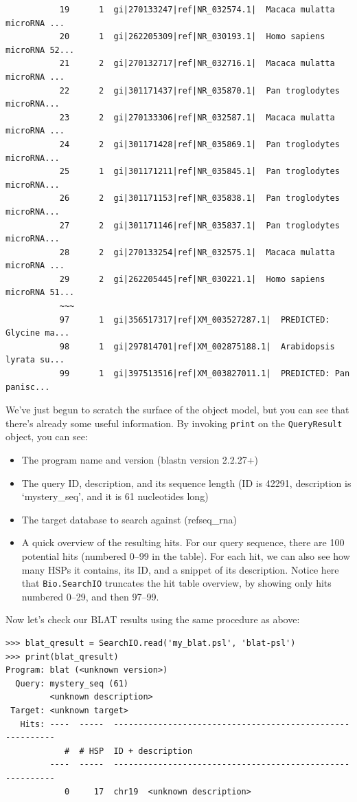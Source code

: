 \documentclass{report}
\begin{document}
\begin{verbatim}
           19      1  gi|270133247|ref|NR_032574.1|  Macaca mulatta microRNA ...
           20      1  gi|262205309|ref|NR_030193.1|  Homo sapiens microRNA 52...
           21      2  gi|270132717|ref|NR_032716.1|  Macaca mulatta microRNA ...
           22      2  gi|301171437|ref|NR_035870.1|  Pan troglodytes microRNA...
           23      2  gi|270133306|ref|NR_032587.1|  Macaca mulatta microRNA ...
           24      2  gi|301171428|ref|NR_035869.1|  Pan troglodytes microRNA...
           25      1  gi|301171211|ref|NR_035845.1|  Pan troglodytes microRNA...
           26      2  gi|301171153|ref|NR_035838.1|  Pan troglodytes microRNA...
           27      2  gi|301171146|ref|NR_035837.1|  Pan troglodytes microRNA...
           28      2  gi|270133254|ref|NR_032575.1|  Macaca mulatta microRNA ...
           29      2  gi|262205445|ref|NR_030221.1|  Homo sapiens microRNA 51...
           ~~~
           97      1  gi|356517317|ref|XM_003527287.1|  PREDICTED: Glycine ma...
           98      1  gi|297814701|ref|XM_002875188.1|  Arabidopsis lyrata su...
           99      1  gi|397513516|ref|XM_003827011.1|  PREDICTED: Pan panisc...
\end{verbatim}

We've just begun to scratch the surface of the object model, but you can see that
there's already some useful information. By invoking \verb|print| on the
\verb|QueryResult| object, you can see:

\begin{itemize}
\item The program name and version (blastn version 2.2.27+)
\item The query ID, description, and its sequence length (ID is 42291,
    description is `mystery\_seq', and it is 61 nucleotides long)
\item The target database to search against (refseq\_rna)
\item A quick overview of the resulting hits. For our query sequence, there are
    100 potential hits (numbered 0--99 in the table). For each hit, we can also see
    how many HSPs it contains, its ID, and a snippet of its description. Notice
    here that \verb|Bio.SearchIO| truncates the hit table overview, by showing
    only hits numbered 0--29, and then 97--99.
\end{itemize}

Now let's check our BLAT results using the same procedure as above:

\begin{verbatim}
>>> blat_qresult = SearchIO.read('my_blat.psl', 'blat-psl')
>>> print(blat_qresult)
Program: blat (<unknown version>)
  Query: mystery_seq (61)
         <unknown description>
 Target: <unknown target>
   Hits: ----  -----  ----------------------------------------------------------
            #  # HSP  ID + description
         ----  -----  ----------------------------------------------------------
            0     17  chr19  <unknown description>
\end{verbatim}
\end{document}
